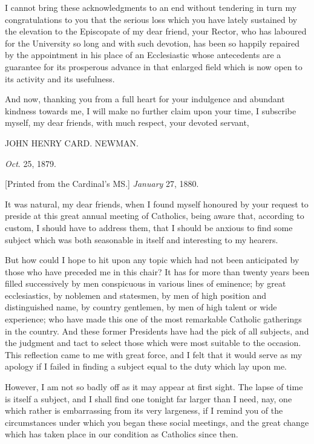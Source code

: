 I cannot bring these acknowledgments to an end without tendering in
turn my congratulations to you that the serious loss which you have
lately sustained by the elevation to the Episcopate of my dear friend,
your Rector, who has laboured for the University so long and with such
devotion, has been so happily repaired by the appointment in his place
of an Ecclesiastic whose antecedents are a guarantee for its
prosperous advance in that enlarged field which is now open to its
activity and its usefulness.

And now, thanking you from a full heart for your indulgence and
abundant kindness towards me, I will make no further claim upon
your time, I subscribe myself, my dear friends, with much respect,
your devoted servant,

JOHN HENRY CARD.
NEWMAN.

\emph{Oct}. 25, 1879.


[Printed from the Cardinal's MS.]
\emph{January} 27, 1880.

It was natural, my dear friends, when I found myself honoured by your
request to preside at this great annual meeting of Catholics, being
aware that, according to custom, I should have to address them, that I
should be anxious to find some subject which was both seasonable in
itself and interesting to my hearers.

But how could I hope to hit upon any topic which had not been
anticipated by those who have preceded me in this chair? It has for
more than twenty years been filled successively by men conspicuous in
various lines of eminence; by great ecclesiastics, by noblemen and
statesmen, by men of high position and distinguished name, by country
gentlemen, by men of high talent or wide experience; who have made
this one of the most remarkable Catholic gatherings in the country.
And these former Presidents have had the pick of all subjects, and the
judgment and tact to select those which were most suitable to the
occasion. This reflection came to me with great force, and I felt that
it would serve as my apology if I failed in finding a subject equal to
the duty which lay upon me.

However, I am not so badly off as it may appear at first sight. The
lapse of time is itself a subject, and I shall find one tonight far
larger than I need, nay, one which rather is embarrassing from its
very largeness, if I remind you of the circumstances under which you began these social meetings, and the great change which has taken
place in our condition as Catholics since then.

